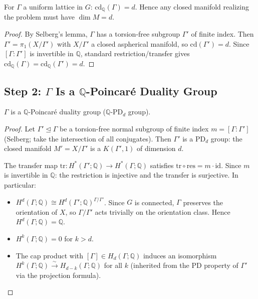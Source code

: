 \begin{corollary}\label{cor:q7-forced-dim}
For $\Gamma$ a uniform lattice in $G$: $\mathrm{cd}_{\mathbb Q}(\Gamma)=d$.
Hence any closed manifold realizing the problem must have $\dim M=d$.
\end{corollary}

\begin{proof}
By Selberg's lemma, $\Gamma$ has a torsion-free subgroup $\Gamma'$ of finite index.
Then $\Gamma'=\pi_1(X/\Gamma')$ with $X/\Gamma'$ a closed aspherical manifold, so $\mathrm{cd}(\Gamma')=d$.
Since $[\Gamma:\Gamma']$ is invertible in $\mathbb Q$, standard restriction/transfer gives
$\mathrm{cd}_{\mathbb Q}(\Gamma)=\mathrm{cd}_{\mathbb Q}(\Gamma')=d$.
\end{proof}


\subsection*{Step 2: $\Gamma$ Is a $\mathbb Q$-Poincar\'e Duality Group}

\begin{proposition}\label{prop:q7-QPD}
$\Gamma$ is a $\mathbb Q$-Poincar\'e duality group ($\mathbb Q$-PD$_d$ group).
\end{proposition}

\begin{proof}
Let $\Gamma'\trianglelefteq\Gamma$ be a torsion-free normal subgroup of finite index
$m=[\Gamma:\Gamma']$ (Selberg; take the intersection of all conjugates).
Then $\Gamma'$ is a $\mathrm{PD}_d$ group: the closed manifold $M'=X/\Gamma'$ is a $K(\Gamma',1)$
of dimension $d$.

The transfer map $\mathrm{tr}\colon H^*(\Gamma';\mathbb Q)\to H^*(\Gamma;\mathbb Q)$ satisfies
$\mathrm{tr}\circ\mathrm{res}=m\cdot\mathrm{id}$.
Since $m$ is invertible in $\mathbb Q$: the restriction is injective and the transfer is surjective.
In particular:
\begin{itemize}
\item $H^d(\Gamma;\mathbb Q)\cong H^d(\Gamma';\mathbb Q)^{\Gamma/\Gamma'}$.
  Since $G$ is connected, $\Gamma$ preserves the orientation of $X$,
  so $\Gamma/\Gamma'$ acts trivially on the orientation class.
  Hence $H^d(\Gamma;\mathbb Q)=\mathbb Q$.
\item $H^k(\Gamma;\mathbb Q)=0$ for $k>d$.
\item The cap product with $[\Gamma]\in H_d(\Gamma;\mathbb Q)$ induces an isomorphism
  $H^k(\Gamma;\mathbb Q)\xrightarrow{\sim}H_{d-k}(\Gamma;\mathbb Q)$ for all $k$
  (inherited from the PD property of $\Gamma'$ via the projection formula).
\end{itemize}
\end{proof}



